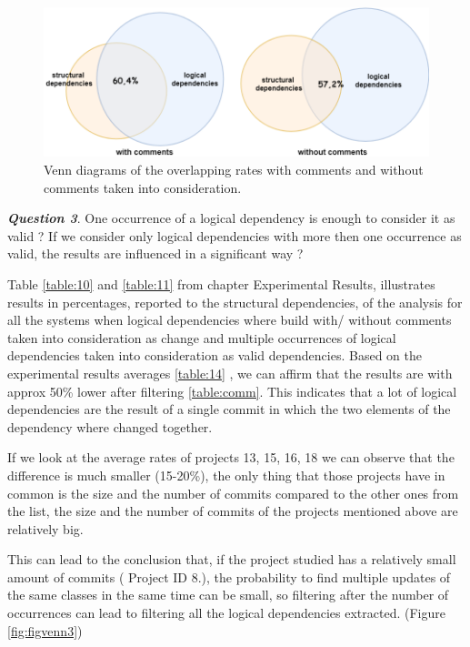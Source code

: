 \documentclass[conference]{IEEEtran}
\begin{document}
\begin{figure}[htb]
\centering
\includegraphics[scale=0.5]{figvenn2.png}
\caption{Venn diagrams of the overlapping rates with comments and without comments taken into consideration.}
\label{fig:figvenn2}
\end{figure}



\textit{\textbf{Question 3}}. One occurrence of a logical dependency is enough to consider it as valid ? If we consider only logical dependencies with more then one occurrence as valid, the results are influenced in a significant way ?

Table \ref{table:10} and \ref{table:11} from chapter Experimental Results,  illustrates results in percentages, reported to the structural dependencies, of the analysis for all the systems when logical dependencies where build with/ without comments taken into consideration as change and multiple occurrences of logical dependencies taken into consideration as valid dependencies. Based on the experimental results averages \ref{table:14} , we can affirm that the results are with approx 50\% lower after filtering \ref{table:comm}. This indicates that a lot of logical dependencies are the result of a single commit in which the two elements of the dependency where changed together. 

If we look at the average rates of projects 13, 15, 16, 18 we can observe that the difference is much smaller (15-20\%), the only thing that those projects have in common is the size and the number of commits compared to the other ones from the list, the size and the number of commits of the projects mentioned above are relatively big. 

This can lead to the conclusion that, if the project studied has a relatively small amount of commits ( Project ID 8.), the probability to find multiple updates of the same classes in the same time can be small, so filtering after the number of occurrences can lead to filtering all the logical dependencies extracted. (Figure \ref{fig:figvenn3})
\end{document}
